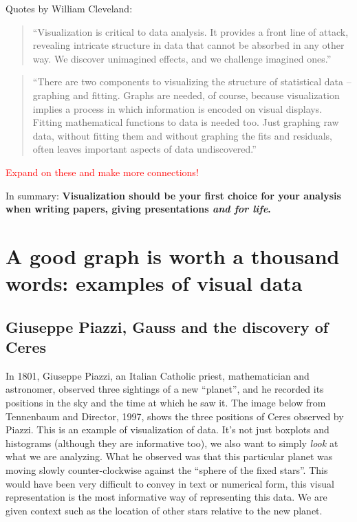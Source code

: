 Quotes by William Cleveland:
\begin{quote}
``Visualization is critical to data analysis. It provides a front line of attack, revealing intricate structure in data that cannot be absorbed in any other way. We discover unimagined effects, and we challenge imagined ones.''
\end{quote}

\begin{quote} 
``There are two components to visualizing the structure of statistical data – graphing and fitting. Graphs are needed, of course, because visualization implies a process in which information is encoded on visual displays. Fitting mathematical functions to data is needed too. Just graphing raw data, without fitting them and without graphing the fits and residuals, often leaves important aspects of data undiscovered.''
\end{quote}

\textcolor{red}{Expand on these and make more connections!}

In summary:
{\bf Visualization should be your first choice for your analysis when writing papers, giving presentations \emph{and for life}.}


\section{A good graph is worth a thousand words: examples of visual data}

\subsection*{Giuseppe Piazzi, Gauss and the discovery of Ceres}

In 1801, Giuseppe Piazzi, an Italian Catholic priest, mathematician and astronomer, observed three sightings of a new ``planet'', and he recorded its positions in the sky and the time at which he saw it. The image below from Tennenbaum and Director, 1997, shows the three positions of Ceres observed by Piazzi. This is an example of visualization of data. It's not just boxplots and histograms (although they are informative too), we also want to simply \emph{look} at what we are analyzing. What he observed was that this particular planet was moving slowly counter-clockwise against the ``sphere of the fixed stars''. This would have been very difficult to convey in text or numerical form, this visual representation is the most informative way of representing this data. We are given context such as the location of other stars relative to the new planet. 


